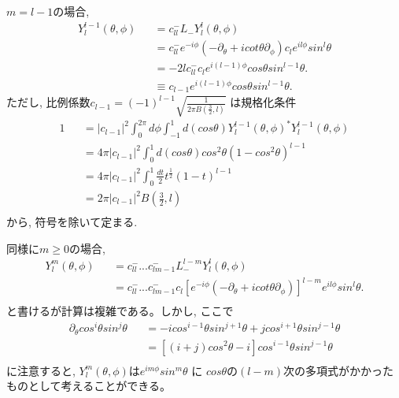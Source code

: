 \documentclass[11pt,a4paper]{jsarticle}
\begin{document}
$m=l-1$の場合, 
\begin{eqnarray}
Y_l^{l-1} (\theta,\phi) &&= c^-_{ll} L_- Y_l^l(\theta,\phi) \nonumber \\
&&=c^-_{ll} e^{-i\phi} (-\partial_\theta+icot\theta \partial_\phi)c_l e^{il\phi} sin^l \theta \nonumber \\
&&=- 2l  c^-_{ll} c_l e^{i(l-1)\phi} cos \theta sin^{l-1} \theta. \nonumber \\
&&\equiv c_{l-1} e^{i(l-1)\phi} cos \theta sin^{l-1} \theta. 
\end{eqnarray}
ただし, 比例係数$c_{l-1}=(-1)^{l-1}\sqrt{\frac{1}{2\pi B(\frac{3}{2}, l)}}$ は規格化条件
\begin{eqnarray}
1 &&= |c_{l-1}|^2 \int_0^{2\pi}d\phi  \int_{-1}^{1} d(cos\theta) Y_l^{l-1}(\theta,\phi)^* Y_l^{l-1}(\theta,\phi)\nonumber \\
&&= 4\pi  |c_{l-1}|^2 \int_{0}^{1} d(cos\theta) cos^2\theta (1-cos^2\theta)^{l-1} \nonumber \\
&&= 4\pi  |c_{l-1}|^2 \int_{0}^{1}  \frac{dt}{2}t^{\frac{1}{2}} (1-t)^{l-1} \nonumber \\
&&= 2\pi  |c_{l-1}|^2 B(\frac{3}{2}, l) \nonumber \\
\end{eqnarray}
から, 符号を除いて定まる.  

同様に$m\ge0$の場合, 
\begin{eqnarray}
Y_l^m (\theta,\phi) &&= c^-_{ll} ... c^-_{lm-1} L_-^{l-m} Y_l^l(\theta,\phi) \nonumber \\
&&=c^-_{ll}...c^-_{lm-1} c_l  [e^{-i\phi} (-\partial_\theta+icot\theta \partial_\phi)]^{l-m} e^{il\phi} sin^l \theta. \nonumber \\
\end{eqnarray}
と書けるが計算は複雑である。しかし, ここで
\begin{eqnarray}
\partial_\theta cos^i \theta sin^j \theta &&= - i cos^{i-1} \theta sin^{j+1} \theta + j cos^{i+1} \theta sin^{j-1} \theta \nonumber \\
&&= [ (i+j)cos^2 \theta -i  ] cos^{i-1} \theta sin^{j-1} \theta \nonumber \\
\end{eqnarray}
に注意すると, $Y_l^m (\theta,\phi)$は$e^{im\phi} sin^m \theta$ に $cos \theta$の$(l-m)$次の多項式がかかったものとして考えることができる。
\end{document}
